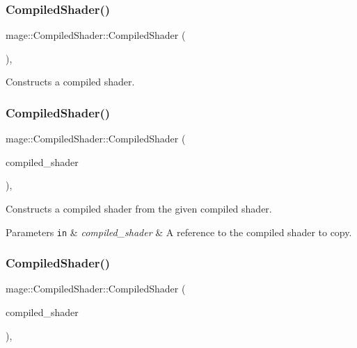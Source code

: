 \subsubsection{\texorpdfstring{Compiled\+Shader()}{CompiledShader()}\hspace{0.1cm}{\footnotesize\ttfamily [1/3]}}
{\footnotesize\ttfamily mage\+::\+Compiled\+Shader\+::\+Compiled\+Shader (\begin{DoxyParamCaption}{ }\end{DoxyParamCaption})\hspace{0.3cm}{\ttfamily [protected]}, {\ttfamily [default]}}

Constructs a compiled shader. \hypertarget{structmage_1_1_compiled_shader_a421bb5715494eea7c13d3dbb88a191bc}{}\label{structmage_1_1_compiled_shader_a421bb5715494eea7c13d3dbb88a191bc} 
\subsubsection{\texorpdfstring{Compiled\+Shader()}{CompiledShader()}\hspace{0.1cm}{\footnotesize\ttfamily [2/3]}}
{\footnotesize\ttfamily mage\+::\+Compiled\+Shader\+::\+Compiled\+Shader (\begin{DoxyParamCaption}\item[{const \hyperlink{structmage_1_1_compiled_shader}{Compiled\+Shader} \&}]{compiled\+\_\+shader }\end{DoxyParamCaption})\hspace{0.3cm}{\ttfamily [protected]}, {\ttfamily [default]}}

Constructs a compiled shader from the given compiled shader.


\begin{DoxyParams}[1]{Parameters}
\mbox{\tt in}  & {\em compiled\+\_\+shader} & A reference to the compiled shader to copy. \\
\hline
\end{DoxyParams}
\hypertarget{structmage_1_1_compiled_shader_a8960c4c808bd170ca00a50c05148ae8c}{}\label{structmage_1_1_compiled_shader_a8960c4c808bd170ca00a50c05148ae8c} 
\subsubsection{\texorpdfstring{Compiled\+Shader()}{CompiledShader()}\hspace{0.1cm}{\footnotesize\ttfamily [3/3]}}
{\footnotesize\ttfamily mage\+::\+Compiled\+Shader\+::\+Compiled\+Shader (\begin{DoxyParamCaption}\item[{\hyperlink{structmage_1_1_compiled_shader}{Compiled\+Shader} \&\&}]{compiled\+\_\+shader }\end{DoxyParamCaption})\hspace{0.3cm}{\ttfamily [protected]}, {\ttfamily [default]}}

